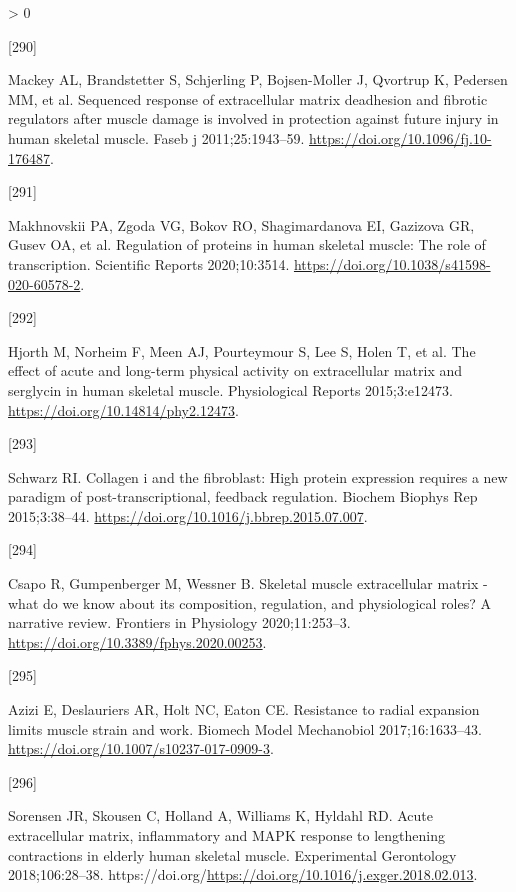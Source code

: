 \documentclass[twoside,10pt]{gihclass} %
\newlength{\cslhangindent}
\newlength{\csllabelwidth}
\newenvironment{CSLReferences}[3] %
 {%
  \setlength{\parindent}{0pt}
  \ifodd #1 \everypar{\setlength{\hangindent}{\cslhangindent}}\ignorespaces\fi
  \ifnum #2 > 0
  \setlength{\parskip}{#2\baselineskip}
  \fi
 }%
 {}
\newcommand{\CSLLeftMargin}[1]{\parbox[t]{\maxof{\widthof{#1}}{\csllabelwidth}}{#1}}
\newcommand{\CSLRightInline}[1]{\parbox[t]{\linewidth}{#1}}
\begin{document}
\begin{CSLReferences}{0}{0}
\leavevmode\hypertarget{ref-RN2453}{}%
\CSLLeftMargin{{[}290{]} }
\CSLRightInline{Mackey AL, Brandstetter S, Schjerling P, Bojsen-Moller J, Qvortrup K, Pedersen MM, et al. Sequenced response of extracellular matrix deadhesion and fibrotic regulators after muscle damage is involved in protection against future injury in human skeletal muscle. Faseb j 2011;25:1943--59. \url{https://doi.org/10.1096/fj.10-176487}.}

\leavevmode\hypertarget{ref-RN2448}{}%
\CSLLeftMargin{{[}291{]} }
\CSLRightInline{Makhnovskii PA, Zgoda VG, Bokov RO, Shagimardanova EI, Gazizova GR, Gusev OA, et al. Regulation of proteins in human skeletal muscle: The role of transcription. Scientific Reports 2020;10:3514. \url{https://doi.org/10.1038/s41598-020-60578-2}.}

\leavevmode\hypertarget{ref-RN2459}{}%
\CSLLeftMargin{{[}292{]} }
\CSLRightInline{Hjorth M, Norheim F, Meen AJ, Pourteymour S, Lee S, Holen T, et al. The effect of acute and long-term physical activity on extracellular matrix and serglycin in human skeletal muscle. Physiological Reports 2015;3:e12473. \url{https://doi.org/10.14814/phy2.12473}.}

\leavevmode\hypertarget{ref-RN2449}{}%
\CSLLeftMargin{{[}293{]} }
\CSLRightInline{Schwarz RI. Collagen i and the fibroblast: High protein expression requires a new paradigm of post-transcriptional, feedback regulation. Biochem Biophys Rep 2015;3:38--44. \url{https://doi.org/10.1016/j.bbrep.2015.07.007}.}

\leavevmode\hypertarget{ref-RN2460}{}%
\CSLLeftMargin{{[}294{]} }
\CSLRightInline{Csapo R, Gumpenberger M, Wessner B. Skeletal muscle extracellular matrix - what do we know about its composition, regulation, and physiological roles? A narrative review. Frontiers in Physiology 2020;11:253--3. \url{https://doi.org/10.3389/fphys.2020.00253}.}

\leavevmode\hypertarget{ref-RN2450}{}%
\CSLLeftMargin{{[}295{]} }
\CSLRightInline{Azizi E, Deslauriers AR, Holt NC, Eaton CE. Resistance to radial expansion limits muscle strain and work. Biomech Model Mechanobiol 2017;16:1633--43. \url{https://doi.org/10.1007/s10237-017-0909-3}.}

\leavevmode\hypertarget{ref-RN2423}{}%
\CSLLeftMargin{{[}296{]} }
\CSLRightInline{Sorensen JR, Skousen C, Holland A, Williams K, Hyldahl RD. Acute extracellular matrix, inflammatory and MAPK response to lengthening contractions in elderly human skeletal muscle. Experimental Gerontology 2018;106:28--38. https://doi.org/\url{https://doi.org/10.1016/j.exger.2018.02.013}.}


\end{CSLReferences}
\end{document}
